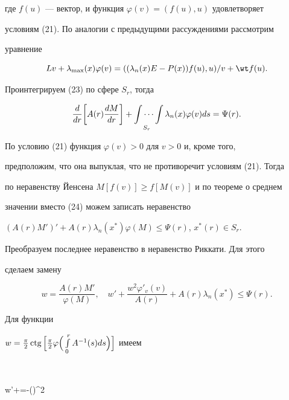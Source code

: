 где $f(u)$ --- вектор, и функция $\varphi(v)=(f(u),u)$ удовлетворяет 


условиям (21). По аналогии с предыдущими рассуждениями рассмотрим 


уравнение 


\begin{equation} 


L v+\lambda_{\max}(x)\varphi(v)= 


((\lambda_n(x)E-P(x))f(u),u)/v+\wt f(u). 


\end{equation} 


Проинтегрируем (23) по сфере $S_r$, тогда 


\begin{equation} 


\frac{d}{dr}\bigg[A(r)\frac{dM}{dr}\bigg]+\idotsint\limits_{S_r} 


\lambda_n(x)\varphi(v)ds=\Psi(r). 


\end{equation} 


По условию (21) функция $\varphi(v)>0$ для $v>0$ и, кроме того, 


предположим, что она выпуклая, что не противоречит условиям (21). Тогда 


по неравенству Йенсена $M[f(v)]\ge f[M(v)]$ и по теореме о среднем 


значении вместо (24) можем записать неравенство 


$(A(r)M')'+A(r)\lambda_n(x^*)\varphi(M)\le\Psi(r)$, $x^*(r)\in S_r$. 


Преобразуем последнее неравенство в неравенство Риккати. Для этого 


сделаем замену 


\begin{equation} 


w=\frac{A(r)M'}{\varphi(M)},\quad 


w'+\frac{w^2\varphi'_v(v)}{A(r)}+A(r) 


\lambda_n(x^*)\le\Psi(r). 


\end{equation} 


Для функции 


$w=\frac{\pi}{2}\ctg\Big[\frac{\pi}{2}\varphi\Big( 


\int\limits^r_0A^{-1}(s)ds\Big)\Big]$ имеем 


$$ 


w'+=-\bigg(\bigg)^2 


